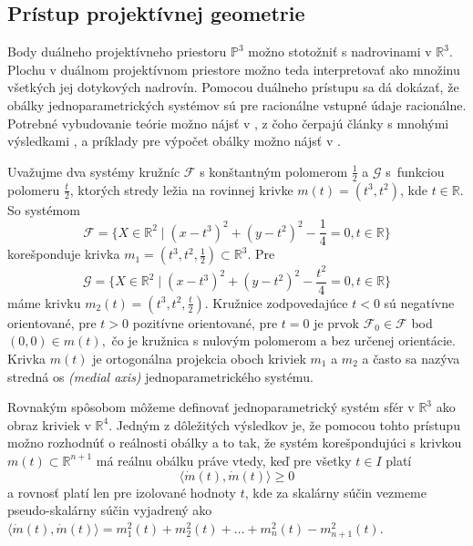\subsection{Prístup projektívnej geometrie}
Body duálneho projektívneho priestoru $\mathbb{P}^3 $ možno stotožniť s nadrovinami v $\mathbb{R}^3$. Plochu v duálnom projektívnom priestore možno teda interpretovať ako množinu všetkých jej dotykových nadrovín. Pomocou duálneho prístupu sa dá dokázať, že obálky jednoparametrických systémov sú pre racionálne vstupné údaje racionálne. Potrebné vybudovanie teórie možno nájsť v \cite{Pott01}, z čoho čerpajú články s mnohými výsledkami \cite{Pet08}, \cite{Pet98} a príklady pre výpočet obálky možno nájsť v \cite{Vra22}.
\begin{example}
Uvažujme dva systémy kružníc $\mathcal{F}$ s konštantným polomerom $\frac{1}{2}$ a $\mathcal{G}$ s~funkciou polomeru $\frac{t}{2}$, ktorých stredy ležia na rovinnej krivke $m(t) = (t^3, t^2)$, kde $t \in \mathbb{R}.$
So systémom
$$ \mathcal{F} = \{ X \in \mathbb{R}^2 \mid (x - t^3)^2 + (y - t^2)^2 - \frac{1}{4} = 0, t \in \mathbb{R} \}$$
korešponduje krivka $m_1 = (t^3, t^2, \frac{1}{2})\subset \mathbb{R}^3$.
Pre
$$ \mathcal{G} = \{ X \in \mathbb{R}^2 \mid (x - t^3)^2 + (y - t^2)^2 - \frac{t^2}{4} = 0, t \in \mathbb{R} \}$$
máme krivku $m_2(t) = (t^3, t^2, \frac{t}{2}).$
Kružnice zodpovedajúce $t < 0$ sú negatívne orientované, pre $t > 0$ pozitívne orientované, pre $t = 0$ je prvok $\mathcal{F}_0 \in \mathcal{F}$ bod $ (0, 0) \in m(t), $ čo je kružnica s nulovým polomerom a bez určenej orientácie.
Krivka $m(t)$ je ortogonálna projekcia oboch kriviek $m_1$ a $m_2$ a často sa nazýva stredná os \textit{(medial axis)} jednoparametrického systému.
\end{example}

Rovnakým spôsobom môžeme definovať jednoparametrický systém sfér v $\mathbb{R}^3$ ako obraz kriviek v $\mathbb{R}^4$.
Jedným z dôležitých výsledkov je, že pomocou tohto prístupu možno rozhodnúť o reálnosti obálky a to tak, že systém korešpondujúci s krivkou $m(t) \subset \mathbb{R}^{n+1}$ má reálnu obálku práve vtedy, keď pre všetky $t \in I $ platí 
$$\langle \dot{m}(t), \dot{m}(t) \rangle \geq 0$$ 
a rovnosť platí len pre izolované hodnoty $t$, kde za skalárny súčin vezmeme pseudo-skalárny súčin vyjadrený ako $\langle \dot{m}(t), \dot{m}(t) \rangle = m_1^2(t) + m_2^2(t) + \ldots + m_n^2(t) - m_{n+1}^2(t).$

